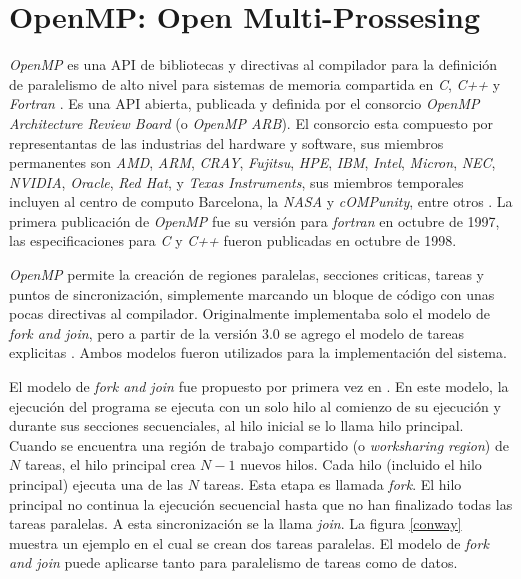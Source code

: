 
\section{OpenMP: Open Multi-Prossesing}

\label{mt_openmp}

\emph{OpenMP} es una API de bibliotecas y directivas al compilador para la
definición de paralelismo de alto nivel para sistemas de memoria compartida en
\emph{C}, \emph{C++} y \emph{Fortran} \cite{ompWeb}. Es una API abierta,
publicada y definida por el consorcio \emph{OpenMP Architecture Review Board}
(o \emph{OpenMP ARB}). El consorcio esta compuesto por representantas de las
industrias del hardware y software, sus miembros permanentes son \emph{AMD},
\emph{ARM}, \emph{CRAY}, \emph{Fujitsu}, \emph{HPE}, \emph{IBM}, \emph{Intel},
\emph{Micron}, \emph{NEC}, \emph{NVIDIA}, \emph{Oracle}, \emph{Red Hat}, y
\emph{Texas Instruments}, sus miembros temporales incluyen al centro de
computo Barcelona, la \emph{NASA} y \emph{cOMPunity}, entre otros
\cite{ompWeb}. La primera publicación de \emph{OpenMP} fue su versión para
\emph{fortran} en octubre de 1997, las especificaciones para \emph{C} y
\emph{C++} fueron publicadas en octubre de 1998.

\emph{OpenMP} permite la creación de regiones paralelas, secciones criticas,
tareas y puntos de sincronización, simplemente marcando un bloque de código
con unas pocas directivas al compilador. Originalmente implementaba solo el
modelo de \emph{fork and join}, pero a partir de la versión $3.0$ se agrego el
modelo de tareas explicitas \cite{openmp08}. Ambos modelos fueron utilizados
para la implementación del sistema.

El modelo de \emph{fork and join} fue propuesto por primera vez en
\cite{conway1963}. En este modelo, la ejecución del programa se ejecuta con un
solo hilo al comienzo de su ejecución y durante sus secciones secuenciales, al
hilo inicial se lo llama hilo principal. Cuando se encuentra una región de
trabajo compartido (o \emph{worksharing region}) de $N$ tareas, el hilo
principal crea $N-1$ nuevos hilos. Cada hilo (incluido el hilo principal)
ejecuta una de las $N$ tareas. Esta etapa es llamada \emph{fork}. El hilo
principal no continua la ejecución secuencial hasta que no han finalizado todas
las tareas paralelas. A esta sincronización se la llama \emph{join}. La figura
\ref{conway} muestra un ejemplo en el cual se crean dos tareas paralelas. El
modelo de \emph{fork and join} puede aplicarse tanto para paralelismo de tareas
como de datos.


